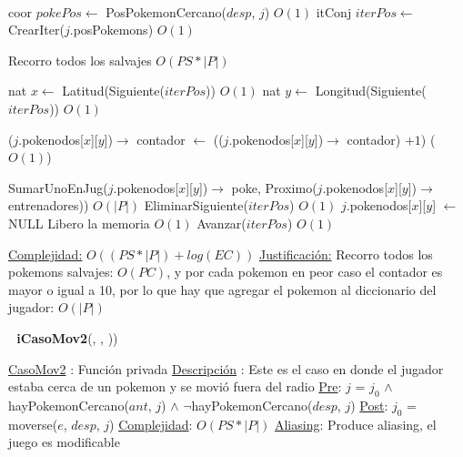 \begin{Algoritmos}
\begin{algorithmic}[1]
$ $\newline
$ $\newline

\State coor $pokePos \gets$ PosPokemonCercano($desp$, $j$) \Comment $O(1)$
\State itConj $iterPos \gets$ CrearIter($j$.posPokemons) \Comment $O(1)$ 

 Recorro todos los salvajes \Comment $O(PS * |P|)$

	\State nat $x \gets$ Latitud(Siguiente($iterPos$)) \Comment $O(1)$
	\State nat $y \gets$ Longitud(Siguiente($iterPos$)) \Comment $O(1)$		
	
		\State ($j$.pokenodos[$x$][$y$])$\rightarrow$ contador $\gets$ (($j$.pokenodos[$x$][$y$])$\rightarrow$ contador) $+ 1$) \Comment($O(1)$)
	\EndIf
	
		\State SumarUnoEnJug($j$.pokenodos[$x$][$y$])$\rightarrow$ poke, Proximo($j$.pokenodos[$x$][$y$])$\rightarrow$ entrenadores)) \Comment $O(|P|)$
		\State EliminarSiguiente($iterPos$) \Comment $O(1)$
		\State $j$.pokenodos[$x$][$y$] $\gets$ NULL \Comment Libero la memoria $O(1)$
	\Else 
		\State Avanzar($iterPos$)	\Comment $O(1)$	
	\EndIf

\EndWhile 

\medskip
\Statex \underline{Complejidad:} $O((PS *|P|) + log(EC))$ 
\Statex \underline{Justificaci\'on:} Recorro todos los pokemons salvajes: $O(PC)$, y por cada pokemon en peor caso el contador es mayor o igual a 10, por lo que hay que agregar el pokemon al diccionario del jugador: $O(|P|)$
\end{algorithmic}

$ $\newline
$ $\newline
{\textbf{iCasoMov2}(,  , ))}
\begin{algorithmic}[1]

\Statex \underline{CasoMov2} : Funci\'on privada 
\Statex \underline{Descripci\'on} : Este es el caso en donde el jugador estaba cerca de un pokemon y se movi\'o fuera del radio
\Statex \underline{Pre}: $j$ = $j_0$ $\land$ hayPokemonCercano($ant$, $j$) $\land$ $\neg$hayPokemonCercano($desp$, $j$) 
\Statex \underline{Post}: $j_0$ = moverse($e$, $desp$, $j$) 
\Statex \underline{Complejidad}: $O(PS *|P|)$ 
\Statex \underline{Aliasing}: Produce aliasing, el juego es modificable


\end{algorithmic}
\end{Algoritmos}
